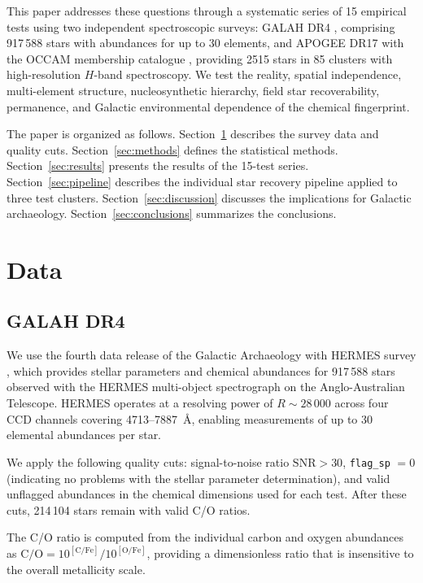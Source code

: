 \documentclass[fleqn,usenatbib]{mnras}
\newcommand{\co}{C/O\xspace}
\begin{document}
This paper addresses these questions through a systematic series of 15 empirical tests using two independent spectroscopic surveys: GALAH DR4 \citep{Buder2024}, comprising 917\,588 stars with abundances for up to 30 elements, and APOGEE DR17 \citep{Abdurrouf2022} with the OCCAM membership catalogue \citep{Donor2020}, providing 2515 stars in 85 clusters with high-resolution $H$-band spectroscopy.
We test the reality, spatial independence, multi-element structure, nucleosynthetic hierarchy, field star recoverability, permanence, and Galactic environmental dependence of the chemical fingerprint.

The paper is organized as follows.
Section~\ref{sec:data} describes the survey data and quality cuts.
Section~\ref{sec:methods} defines the statistical methods.
Section~\ref{sec:results} presents the results of the 15-test series.
Section~\ref{sec:pipeline} describes the individual star recovery pipeline applied to three test clusters.
Section~\ref{sec:discussion} discusses the implications for Galactic archaeology.
Section~\ref{sec:conclusions} summarizes the conclusions.


\section{Data}
\label{sec:data}

\subsection{GALAH DR4}
\label{sec:galah}

We use the fourth data release of the Galactic Archaeology with HERMES survey \citep[GALAH DR4;][]{Buder2024}, which provides stellar parameters and chemical abundances for 917\,588 stars observed with the HERMES multi-object spectrograph on the Anglo-Australian Telescope.
HERMES operates at a resolving power of $R \sim 28\,000$ across four CCD channels covering 4713--7887~\AA, enabling measurements of up to 30 elemental abundances per star.

We apply the following quality cuts: signal-to-noise ratio $\mathrm{SNR} > 30$, \texttt{flag\_sp} $= 0$ (indicating no problems with the stellar parameter determination), and valid unflagged abundances in the chemical dimensions used for each test.
After these cuts, 214\,104 stars remain with valid \co ratios.

The \co ratio is computed from the individual carbon and oxygen abundances as $\mathrm{C/O} = 10^{\mathrm{[C/Fe]}} / 10^{\mathrm{[O/Fe]}}$, providing a dimensionless ratio that is insensitive to the overall metallicity scale.
\end{document}
